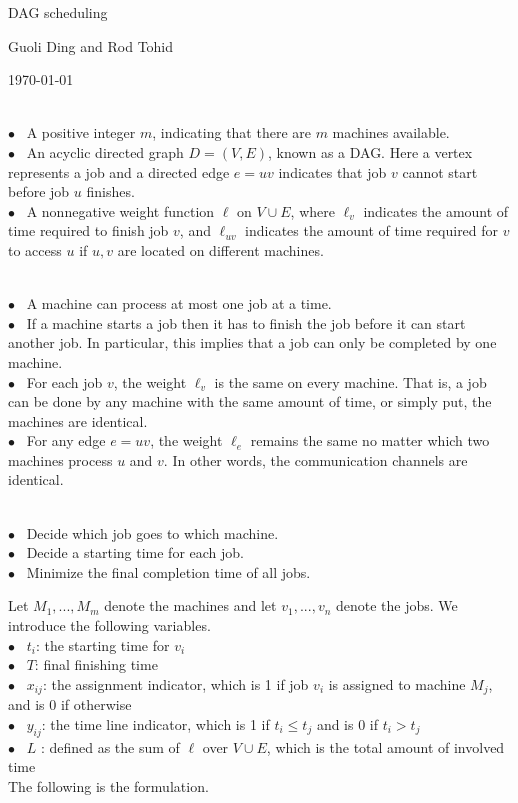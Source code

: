 \documentclass[10pt]{article}
\begin{document}
\centerline{\LARGE DAG scheduling} 

\bigskip
\centerline{\large Guoli Ding and Rod Tohid}

\medskip
\centerline{\large \today}

\bigskip
{} \\ 
\indent $\bullet$ \ A positive integer $m$, indicating that there are $m$
machines available. \\  
\indent $\bullet$ \ An acyclic directed graph $D=(V,E)$, known as a DAG. Here a
vertex represents a job and a directed \makebox[24pt]{} edge $e=uv$ indicates
that job $v$ cannot start before job $u$ finishes.\\ 
\indent $\bullet$ \ A nonnegative weight function $\ell$ on $V\cup E$, where
$\ell_v$ indicates the amount of time required to finish \makebox[23pt]{} job
$v$, and $\ell_{uv}$ indicates the amount of time required for $v$ to access $u$
if $u,v$ are located on different \makebox[23pt]{} machines. 

 \\ 
\indent $\bullet$ \ A machine can process at most one job at a time. \\ 
\indent $\bullet$ \ If a machine starts a job then it has to finish the job
before it can start another job. In particular, \makebox[23pt]{} this implies
that a job can only be completed by one machine.\\ 
\indent $\bullet$ \ For each job $v$, the weight $\ell_v$ is the same on every
machine. That is, a job can be done by any machine \makebox[23pt]{} with the
same amount of time, or simply put, the machines are identical.  \\ 
\indent $\bullet$ \ For any edge $e=uv$, the weight $\ell_e$ remains the same no
matter which two machines process $u$ and $v$. \makebox[23pt]{} In other words,
the communication channels are identical.

 \\ 
\indent $\bullet$ \ Decide which job goes to which machine. \\ 
\indent $\bullet$ \ Decide a starting time for each job.\\ 
\indent $\bullet$ \ Minimize the final completion time of all jobs.

 Let $M_1,...,M_m$ denote the
machines and let $v_1,...,v_n$ denote the jobs. We introduce the following
variables. \\ 
\indent $\bullet$ \ $t_i$: the starting time for $v_i$\\ 
\indent $\bullet$ \ $T$: final finishing time\\  
\indent $\bullet$ \ $x_{ij}$: the assignment indicator, which is 1 if job $v_i$
is assigned to machine $M_j$, and is 0 if otherwise\\ 
\indent $\bullet$ \ $y_{ij}$: the time line indicator, which is 1 if $t_i\le
t_j$ and is 0 if $t_i>t_j$\\ 
\indent $\bullet$ \ $L$ : defined as the sum of $\ell$ over $V\cup E$, which is
the total amount of involved time \\ 
The following is the formulation.
\end{document}
